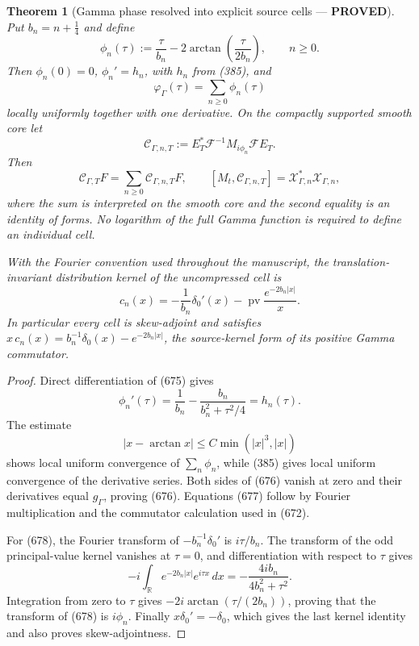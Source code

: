 \documentclass[11pt]{article}
\newtheorem{theorem}{Theorem}
\newcommand{\PROVED}{\textcolor{green!45!black}{\textbf{PROVED}}}
\begin{document}
\begin{theorem}[Gamma phase resolved into explicit source cells ---
\PROVED]
Put \(b_n=n+\frac14\) and define
\begin{equation}
 \phi_n(\tau):=\frac{\tau}{b_n}
 -2\arctan\!\left(\frac{\tau}{2b_n}\right),
 \qquad n\ge0.                                      \tag{675}
\end{equation}
Then \(\phi_n(0)=0\), \(\phi_n'=h_n\), with \(h_n\) from (385), and
\begin{equation}
 \varphi_\Gamma(\tau)=\sum_{n\ge0}\phi_n(\tau)       \tag{676}
\end{equation}
locally uniformly together with one derivative.  On the compactly
supported smooth core let
\[
 \mathscr C_{\Gamma,n,T}
 :=E_T^*\mathcal F^{-1}M_{i\phi_n}\mathcal FE_T .
\]
Then
\begin{equation}
 \mathscr C_{\Gamma,T}F
 =\sum_{n\ge0}\mathscr C_{\Gamma,n,T}F,\qquad
 [M_t,\mathscr C_{\Gamma,n,T}]
 =\mathcal X_{\Gamma,n}^*\mathcal X_{\Gamma,n},      \tag{677}
\end{equation}
where the sum is interpreted on the smooth core and the second equality is
an identity of forms.  No logarithm of the full Gamma function is required
to define an individual cell.

With the Fourier convention used throughout the manuscript, the
translation-invariant distribution kernel of the uncompressed cell is
\begin{equation}
 c_n(x)=
 -\frac1{b_n}\delta_0'(x)
 -\operatorname{pv}\frac{e^{-2b_n|x|}}{x}.          \tag{678}
\end{equation}
In particular every cell is skew-adjoint and satisfies
\(x\,c_n(x)=b_n^{-1}\delta_0(x)-e^{-2b_n|x|}\), the
source-kernel form of its positive Gamma commutator.
\end{theorem}

\begin{proof}
Direct differentiation of (675) gives
\[
 \phi_n'(\tau)
 =\frac1{b_n}-\frac{b_n}{b_n^2+\tau^2/4}=h_n(\tau).
\]
The estimate
\[
 |x-\arctan x|\le C\min(|x|^3,|x|)
\]
shows local uniform convergence of \(\sum_n\phi_n\), while (385) gives
local uniform convergence of the derivative series.  Both sides of (676)
vanish at zero and their derivatives equal \(g_\Gamma\), proving (676).
Equations (677) follow by Fourier multiplication and the commutator
calculation used in (672).

For (678), the Fourier transform of
\(-b_n^{-1}\delta_0'\) is \(i\tau/b_n\).  The transform of the odd
principal-value kernel vanishes at \(\tau=0\), and differentiation with
respect to \(\tau\) gives
\[
 -i\int_{\mathbb R}e^{-2b_n|x|}e^{i\tau x}\,dx
 =-\frac{4ib_n}{4b_n^2+\tau^2}.
\]
Integration from zero to \(\tau\) gives
\(-2i\arctan(\tau/(2b_n))\), proving that the transform of (678) is
\(i\phi_n\).  Finally \(x\delta_0'=-\delta_0\), which gives the last
kernel identity and also proves skew-adjointness.
\end{proof}
\end{document}
